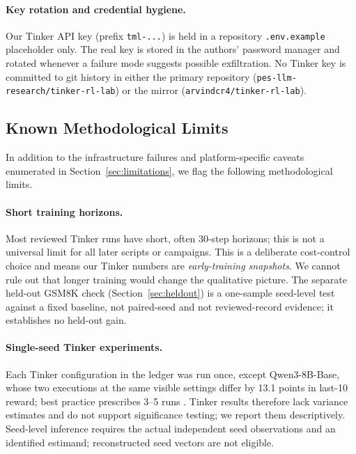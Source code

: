 \paragraph{Key rotation and credential hygiene.}
Our Tinker API key (prefix \texttt{tml-...}) is held in a repository
\texttt{.env.example} placeholder only. The real key is stored in the
authors' password manager and rotated whenever a failure mode suggests
possible exfiltration. No Tinker key is committed to git history in
either the primary repository (\texttt{pes-llm-research/tinker-rl-lab}) or
the mirror (\texttt{arvindcr4/tinker-rl-lab}).

\subsection{Known Methodological Limits}
\label{sec:methodlimits}

In addition to the infrastructure failures and platform-specific caveats
enumerated in Section~\ref{sec:limitations}, we flag the following
methodological limits.

\paragraph{Short training horizons.}
Most reviewed Tinker runs have short, often 30-step horizons; this is not
a universal limit for all later scripts or campaigns. This is a
deliberate cost-control choice and means our Tinker numbers are
\emph{early-training snapshots}. We cannot rule out that longer training
would change the qualitative picture. The separate held-out GSM8K check (Section~\ref{sec:heldout}) is a
one-sample seed-level test against a fixed baseline, not paired-seed and not
reviewed-record evidence; it establishes no held-out gain.

\paragraph{Single-seed Tinker experiments.}
Each Tinker configuration in the ledger was run once, except Qwen3-8B-Base,
whose two executions at the same visible settings differ by 13.1 points in
last-10 reward; best practice prescribes 3--5 runs \cite{henderson2018deep}. Tinker results therefore lack
variance estimates and do not support significance testing; we report
them descriptively. Seed-level inference requires the actual independent seed observations and
an identified estimand; reconstructed seed vectors are not eligible.

